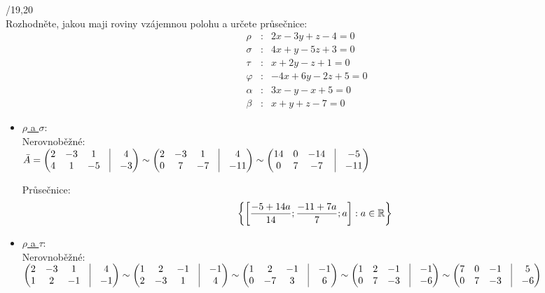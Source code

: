 /19,20\\

Rozhodněte, jakou maji roviny vzájemnou polohu a určete průsečnice: 
\begin{eqnarray*}
	\rho&:& 2x - 3y + z - 4 = 0\\
	\sigma&:& 4x + y -5z +3 = 0\\
	\tau &:& x + 2y - z + 1 =0\\
	\varphi &:& -4x + 6y - 2z +  5 = 0 \\
	\alpha &:& 3x - y - x + 5 =0\\
	\beta &:& x + y + z -7 = 0
\end{eqnarray*}
\begin{itemize}
	\item \underline{$\rho$ a $\sigma$}: \\
		Nerovnoběžné:\\
		$ \bar{A} = \begin{pmatrix}
			2 &-3 &1 &\vline& 4 \\ 
			4 &1 &-5 &\vline& -3 \\ 
		\end{pmatrix}
		\sim
		\begin{pmatrix}
			2 &-3 &1 &\vline& 4 \\ 
			0 &7 &-7 &\vline& -11 \\ 
		\end{pmatrix}
		\sim
		\begin{pmatrix}
			14 &0 &-14 &\vline& -5 \\ 
			0 &7 &-7 &\vline& -11 \\ 
		\end{pmatrix}
		$

		Průsečnice:
		 $$ 
		   \left\{{\left[{\frac{-5+14 a}{14}; \frac{-11+7 a}{7}; a}\right]:a \in \mathbb{R}}\right\} 
		   $$ 
	\item \underline{$\rho$ a $\tau$}: \\
		Nerovnoběžné:\\
		 $  \begin{pmatrix}
			 2 &-3 &1 &\vline& 4 \\ 
			 1 &2 &-1 &\vline& -1 \\ 
		 \end{pmatrix}
		 \sim
		 \begin{pmatrix}
			 1 &2 &-1 &\vline& -1 \\ 
			 2 &-3 &1 &\vline& 4 \\ 
		 \end{pmatrix}
		 \sim
		 \begin{pmatrix}
			 1 &2 &-1 &\vline& -1 \\ 
			 0 &-7 &3 &\vline& 6 \\ 
		 \end{pmatrix}
		 \sim
		 \begin{pmatrix}
			 1 &2 &-1 &\vline& -1 \\ 
			 0 &7 &-3 &\vline& -6 \\ 
		 \end{pmatrix}
		 \sim
		 \begin{pmatrix}
			 7 &0 &-1 &\vline& 5 \\ 
			 0 &7 &-3 &\vline& -6 \\ 
		 \end{pmatrix}
		 $


\end{itemize}
